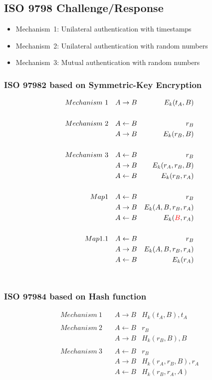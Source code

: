 \subsection{ISO 9798 Challenge/Response}
\begin{itemize}
    \item Mechanism~1: Unilateral authentication with timestamps
    \item Mechanism~2: Unilateral authentication with random numbers
    \item Mechanism~3: Mutual authentication with random numbers
\end{itemize}

\subsubsection{ISO 9798\text{-}2 based on Symmetric-Key Encryption}

\begin{eqnarray*}
    Mechanism~1 \quad & A  \rightarrow B &  E_k(t_A,B)\\
    \\
    Mechanism~2 \quad & A \leftarrow  B & r_B \\
                & A  \rightarrow B & E_k(r_B,B) \\
    \\
    Mechanism~3 \quad & A  \leftarrow B & r_B \\
                & A  \rightarrow B & E_k(r_A,r_B,B) \\
                & A  \leftarrow  B & E_k(r_B,r_A) \\
    \\
    Map1 \quad & A  \leftarrow B & r_B \\
                & A  \rightarrow B & E_k(A, B, r_B,r_A) \\
                & A  \leftarrow  B & E_k(\textcolor{red}{B},r_A) \\
    \\
    Map1.1 \quad & A  \leftarrow B & r_B \\
                & A  \rightarrow B & E_k(A, B, r_B,r_A) \\
                & A  \leftarrow  B & E_k(r_A) 
\end{eqnarray*}\\

\subsubsection{ISO 9798\text{-}4 based on Hash function}
\begin{eqnarray*}
    Mechanism~1 \quad & A \rightarrow B & H_k(t_A,B),t_A \\
    \\
    Mechanism~2 \quad & A \leftarrow B & r_B \\
                      & A \rightarrow B & H_k(r_B,B),B \\
    \\
    Mechanism~3 \quad & A \leftarrow B & r_B \\
                      & A \rightarrow B & H_k(r_A,r_B,B),r_A \\
                      & A \leftarrow B & H_k(r_B,r_A,A) 
\end{eqnarray*}

